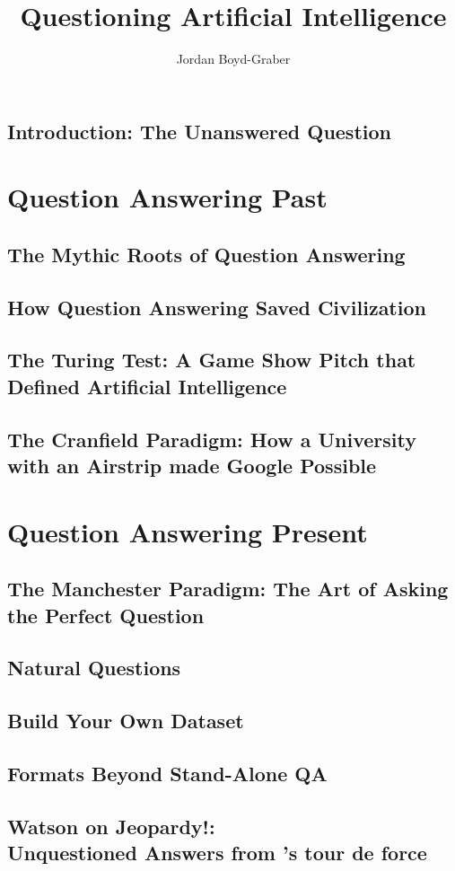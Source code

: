 \documentclass[bfivepaper,twosided,justified,nobib]{style/tufte-book}
\title{Questioning Artificial Intelligence}
\author{Jordan Boyd-Graber}
\newif\ifproposal\proposalfalse
\newcommand{\proposalpart}[1]{
  \ifproposal
  \subsection{#1}
  \else
  \part{#1}
  \fi
}
\newcommand{\chapterfile}[3]{
  \ifproposal
  \paragraph{#3}
  
  \else
  \chapter{#3}
  \label{ch:#1}
  \begin{quote}
    
  \end{quote}
  
  \fi}
\begin{document}
\setcounter{secnumdepth}{0}

\ifproposal

\else

\tableofcontents

\fi








\chapterfile{010}{introduction}{Introduction: The Unanswered Question}

\ifproposal

\fi


\ifproposal

\else



\clearpage


\proposalpart{Question Answering Past}

\chapterfile{110}{epic}{The Mythic Roots of Question Answering}

\chapterfile{120}{civilization}{How Question Answering Saved Civilization}





\chapterfile{130}{turing}{The Turing Test: A Game Show Pitch that
  Defined Artificial Intelligence}

\chapterfile{140}{ir}{The Cranfield Paradigm: How a University with an
  Airstrip made Google Possible}

\proposalpart{Question Answering Present}

\chapterfile{200}{manchester}{The Manchester Paradigm: The Art of Asking the
  Perfect Question}

\chapterfile{210}{datasets_natural}{Natural Questions}    

\chapterfile{220}{datasets_constructed}{Build Your Own Dataset}

\chapterfile{230}{formats}{Formats Beyond Stand-Alone QA}

\fi

\chapterfile{250}{watson}{Watson on Jeopardy!: \\ Unquestioned Answers from \abr{ibm}'s tour de force}

  \ifproposal

  \else
  
\end{document}
